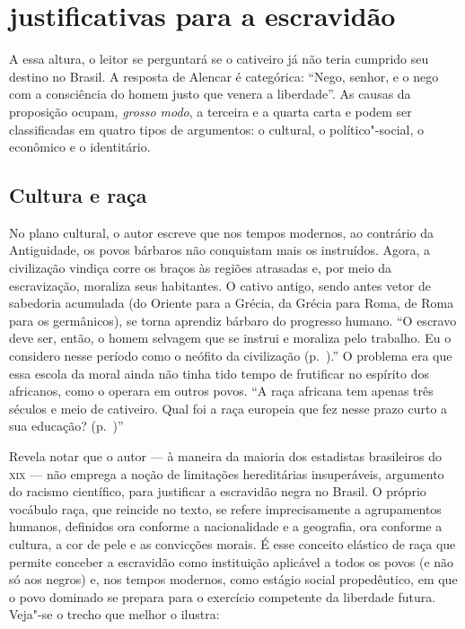 \section{justificativas para a escravidão}

A essa altura, o leitor se perguntará se o cativeiro já não teria
cumprido seu destino no Brasil. A resposta de Alencar é categórica:
``Nego, senhor, e o nego com a consciência do homem justo que venera a
liberdade''. As causas da proposição ocupam, \textit{grosso modo}, a
terceira e a quarta carta e podem ser classificadas em quatro tipos de
argumentos: o cultural, o político"-social, o econômico e o
identitário. 

\subsection{Cultura e raça}

No plano cultural, o autor escreve que nos tempos
modernos, ao contrário da Antiguidade, os povos bárbaros não conquistam
mais os instruídos. Agora, a civilização vindiça corre os braços às
regiões atrasadas e, por meio da escravização, moraliza seus
habitantes. O cativo antigo, sendo antes vetor de sabedoria acumulada
(do Oriente para a Grécia, da Grécia para Roma, de Roma para os
germânicos), se torna aprendiz bárbaro do progresso humano. ``O escravo
deve ser, então, o homem selvagem que se instrui e moraliza pelo
trabalho. Eu o considero nesse período como o neófito da civilização (p.~\pageref{cultura}).''
O problema era que essa escola da moral ainda não tinha tido tempo de
frutificar no espírito dos africanos, como o operara em outros povos.
``A raça africana tem apenas três séculos e meio de cativeiro. Qual foi
a raça europeia que fez nesse prazo curto a sua educação? (p.~\pageref{tresseculos})''

Revela notar que o autor --- à  maneira da maioria dos estadistas
brasileiros do \textsc{xix} --- não emprega a noção de limitações hereditárias
insuperáveis, argumento do racismo científico, para justificar a
escravidão negra no Brasil. O próprio vocábulo raça, que reincide no
texto, se refere imprecisamente a agrupamentos humanos, definidos ora
conforme a nacionalidade e a geografia, ora conforme a cultura, a cor
de pele e as convicções morais. É esse conceito elástico de raça que
permite conceber a escravidão como instituição aplicável a todos os
povos (e não só aos negros) e, nos tempos modernos, como estágio social
propedêutico, em que o povo dominado se prepara para o exercício
competente da liberdade futura. Veja"-se o trecho que melhor o ilustra: 

